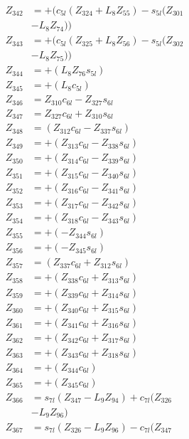 \begin{multicols}{2}
\begin{align}
Z_{342} &= + (c_{5l}(Z_{324} + L_8Z_{55}) - s_{5l}(Z_{301}  \nonumber \\
&- L_8Z_{74})) \nonumber \\
Z_{343} &= + (c_{5l}(Z_{325} + L_8Z_{56}) - s_{5l}(Z_{302}  \nonumber \\
&- L_8Z_{75})) \nonumber \\
Z_{344} &= + (L_8Z_{76}s_{5l}) \nonumber \\
Z_{345} &= + (L_8c_{5l}) \nonumber \\
Z_{346} &= Z_{310}c_{6l} - Z_{327}s_{6l} \nonumber \\
Z_{347} &= Z_{327}c_{6l} + Z_{310}s_{6l} \nonumber \\
Z_{348} &= (Z_{312}c_{6l} - Z_{337}s_{6l}) \nonumber \\
Z_{349} &= + (Z_{313}c_{6l} - Z_{338}s_{6l}) \nonumber \\
Z_{350} &= + (Z_{314}c_{6l} - Z_{339}s_{6l}) \nonumber \\
Z_{351} &= + (Z_{315}c_{6l} - Z_{340}s_{6l}) \nonumber \\
Z_{352} &= + (Z_{316}c_{6l} - Z_{341}s_{6l}) \nonumber \\
Z_{353} &= + (Z_{317}c_{6l} - Z_{342}s_{6l}) \nonumber \\
Z_{354} &= + (Z_{318}c_{6l} - Z_{343}s_{6l}) \nonumber \\
Z_{355} &= + (-Z_{344}s_{6l}) \nonumber \\
Z_{356} &= + (-Z_{345}s_{6l}) \nonumber \\
Z_{357} &= (Z_{337}c_{6l} + Z_{312}s_{6l}) \nonumber \\
Z_{358} &= + (Z_{338}c_{6l} + Z_{313}s_{6l}) \nonumber \\
Z_{359} &= + (Z_{339}c_{6l} + Z_{314}s_{6l}) \nonumber \\
Z_{360} &= + (Z_{340}c_{6l} + Z_{315}s_{6l}) \nonumber \\
Z_{361} &= + (Z_{341}c_{6l} + Z_{316}s_{6l}) \nonumber \\
Z_{362} &= + (Z_{342}c_{6l} + Z_{317}s_{6l}) \nonumber \\
Z_{363} &= + (Z_{343}c_{6l} + Z_{318}s_{6l}) \nonumber \\
Z_{364} &= + (Z_{344}c_{6l}) \nonumber \\
Z_{365} &= + (Z_{345}c_{6l}) \nonumber \\
Z_{366} &= s_{7l}(Z_{347} - L_9Z_{94}) + c_{7l}(Z_{326}  \nonumber \\
&- L_9Z_{96}) \nonumber \\
Z_{367} &= s_{7l}(Z_{326} - L_9Z_{96}) - c_{7l}(Z_{347}  \nonumber \\

\end{align}
\end{multicols}
